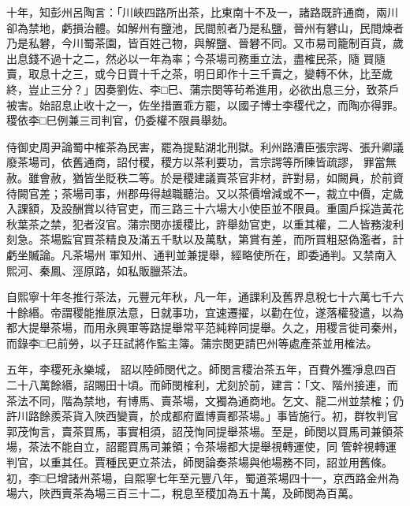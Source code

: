 \begin{pinyinscope}
 十年，知彭州呂陶言：「川峽四路所出茶，比東南十不及一，諸路既許通商，兩川卻為禁地，虧損治體。如解州有鹽池，民間煎者乃是私鹽，晉州有礬山，民間煉者乃是私礬，今川蜀茶園，皆百姓己物，與解鹽、晉礬不同。又市易司籠制百貨，歲出息錢不過十之二，然必以一年為率；今茶場司務重立法，盡榷民茶，隨
 買隨賣，取息十之三，或今日買十千之茶，明日即作十三千賣之，變轉不休，比至歲終，豈止三分？」因奏劉佐、李□巳、蒲宗閔等茍希進用，必欲出息三分，致茶戶被害。始詔息止收十之一，佐坐措置乖方罷，以國子博士李稷代之，而陶亦得罪。稷依李□巳例兼三司判官，仍委權不限員舉劾。



 侍御史周尹論蜀中榷茶為民害，罷為提點湖北刑獄。利州路漕臣張宗諤、張升卿議廢茶場司，依舊通商，詔付稷，稷方以茶利要功，言宗諤等所陳皆疏謬，
 罪當無赦。雖會赦，猶皆坐貶秩二等。於是稷建議賣茶官非材，許對易，如闕員，於前資待闕官差；茶場司事，州郡毋得越職聽治。又以茶價增減或不一，裁立中價，定歲入課額，及設酬賞以待官吏，而三路三十六場大小使臣並不限員。重園戶採造黃花秋葉茶之禁，犯者沒官。蒲宗閔亦援稷比，許舉劾官吏，以重其權，二人皆務浚利刻急。茶場監官買茶精良及滿五千馱以及萬馱，第賞有差，而所買粗惡偽濫者，計虧坐贓論。凡茶場州
 軍知州、通判並兼提舉，經略使所在，即委通判。又禁南入熙河、秦鳳、涇原路，如私販臘茶法。



 自熙寧十年冬推行茶法，元豐元年秋，凡一年，通課利及舊界息稅七十六萬七千六十餘緡。帝謂稷能推原法意，日就事功，宜速遷擢，以勸在位，遂落權發遣，以為都大提舉茶場，而用永興軍等路提舉常平范純粹同提舉。久之，用稷言徙司秦州，而錄李□巳前勞，以子玨試將作監主簿。蒲宗閔更請巴州等處產茶並用榷法。



 五年，李稷死永樂城，
 詔以陸師閔代之。師閔言稷治茶五年，百費外獲凈息四百二十八萬餘緡，詔賜田十頃。而師閔榷利，尤刻於前，建言：「文、階州接連，而茶法不同，階為禁地，有博馬、賣茶場，文獨為通商地。乞文、龍二州並禁榷；仍許川路餘羨茶貨入陜西變賣，於成都府置博賣都茶場。」事皆施行。初，群牧判官郭茂恂言，賣茶買馬，事實相須，詔茂恂同提舉茶場。至是，師閔以買馬司兼領茶場，茶法不能自立，詔罷買馬司兼領；令茶場都大提舉視轉運使，同
 管幹視轉運判官，以重其任。賈種民更立茶法，師閔論奏茶場與他場務不同，詔並用舊條。初，李□巳增諸州茶場，自熙寧七年至元豐八年，蜀道茶場四十一，京西路金州為場六，陜西賣茶為場三百三十二，稅息至稷加為五十萬，及師閔為百萬。




\end{pinyinscope}
